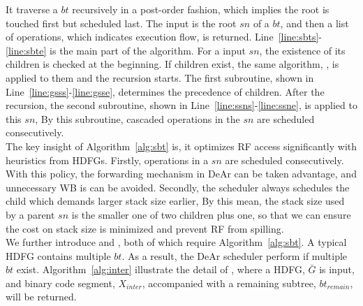         It traverse a $bt$ recursively in a post-order fashion, which implies the root is touched first but scheduled last.
        The input is the root $sn$ of a $bt$, and then a list of operations, which indicates execution flow, is returned.
        Line~\ref{line:sbts}-\ref{line:sbte} is the main part of the algorithm.
        For a input $sn$, the existence of its children is checked at the beginning.
        If children exist, the same algorithm, , is applied to them and the recursion starts.
        The first subroutine,  shown in Line~\ref{line:gsss}-\ref{line:gsse}, determines the precedence of children.
        After the recursion, the second subroutine, 
         shown in Line~\ref{line:ssns}-\ref{line:ssne}, is applied to this $sn$, 
        By this subroutine, cascaded operations in the $sn$ are scheduled consecutively.
        \\\indent
        The key insight of Algorithm~\ref{alg:sbt} is, it optimizes RF access significantly with heuristics from HDFGs.
        Firstly, operations in a $sn$ are scheduled consecutively.
        With this policy, the forwarding mechanism in DeAr can be taken advantage, and unnecessary WB is can be avoided.
        Secondly, the scheduler always schedules the child which demands larger stack size earlier, 
        By this mean, the stack size used by a parent $sn$ is the smaller one of two children plus one, 
        so that we can ensure the cost on stack size is minimized and prevent RF from spilling.
        \\\indent
        We further introduce  and , 
        both of which require Algorithm~\ref{alg:sbt}.
        A typical HDFG contains multiple $bt$.
        As a result, the DeAr scheduler perform  if multiple $bt$ exist.
        Algorithm~\ref{alg:inter} illustrate the detail of , 
        where a HDFG, $\bar{G}$ is input, and binary code segment, 
        $X_{inter}$, accompanied with a remaining subtree, $bt_{remain}$, will be returned.
